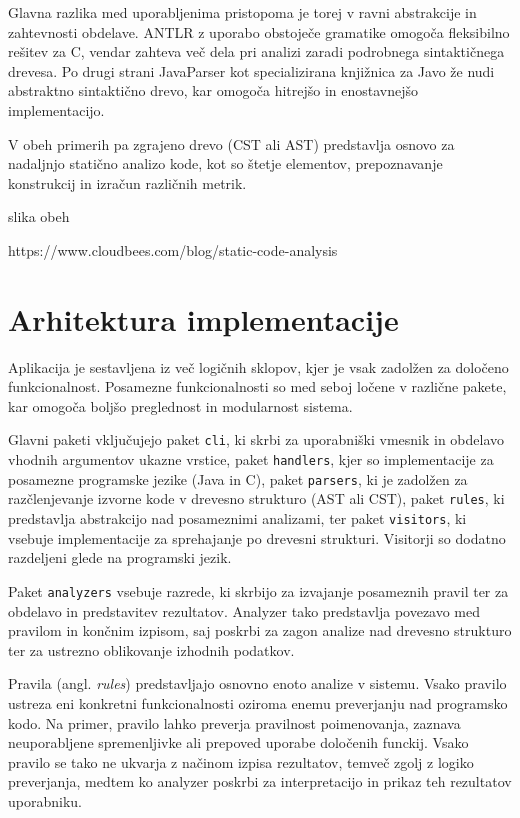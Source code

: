\documentclass[a4paper,12pt,openright]{book}
\begin{document}
Glavna razlika med uporabljenima pristopoma je torej v ravni abstrakcije in zahtevnosti obdelave. ANTLR z uporabo obstoječe gramatike omogoča fleksibilno rešitev za C, vendar zahteva več dela pri analizi zaradi podrobnega sintaktičnega drevesa. Po drugi strani JavaParser kot specializirana knjižnica za Javo že nudi abstraktno sintaktično drevo, kar omogoča hitrejšo in enostavnejšo implementacijo.

V obeh primerih pa zgrajeno drevo (CST ali AST) predstavlja osnovo za nadaljnjo statično analizo kode, kot so štetje elementov, prepoznavanje konstrukcij in izračun različnih metrik.

slika obeh

https://www.cloudbees.com/blog/static-code-analysis

\section{Arhitektura implementacije}

Aplikacija je sestavljena iz več logičnih sklopov, kjer je vsak zadolžen za določeno funkcionalnost. Posamezne funkcionalnosti so med seboj ločene v različne pakete, kar omogoča boljšo preglednost in modularnost sistema.

Glavni paketi vključujejo paket \texttt{cli}, ki skrbi za uporabniški vmesnik in obdelavo vhodnih argumentov ukazne vrstice, paket \texttt{handlers}, kjer so implementacije za posamezne programske jezike (Java in C), paket \texttt{parsers}, ki je zadolžen za razčlenjevanje izvorne kode v drevesno strukturo (AST ali CST), paket \texttt{rules}, ki predstavlja abstrakcijo nad posameznimi analizami, ter paket \texttt{visitors}, ki vsebuje implementacije za sprehajanje po drevesni strukturi. Visitorji so dodatno razdeljeni glede na programski jezik.

Paket \texttt{analyzers} vsebuje razrede, ki skrbijo za izvajanje posameznih pravil ter za obdelavo in predstavitev rezultatov. Analyzer tako predstavlja povezavo med pravilom in končnim izpisom, saj poskrbi za zagon analize nad drevesno strukturo ter za ustrezno oblikovanje izhodnih podatkov.

Pravila (angl. \textit{rules}) predstavljajo osnovno enoto analize v sistemu. Vsako pravilo ustreza eni konkretni funkcionalnosti oziroma enemu preverjanju nad programsko kodo. Na primer, pravilo lahko preverja pravilnost poimenovanja, zaznava neuporabljene spremenljivke ali prepoved uporabe določenih funckij. Vsako pravilo se tako ne ukvarja z načinom izpisa rezultatov, temveč zgolj z logiko preverjanja, medtem ko analyzer poskrbi za interpretacijo in prikaz teh rezultatov uporabniku.
\end{document}

